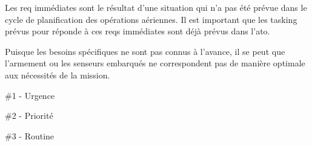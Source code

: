 Les \gls{req} immédiates sont le résultat d'une situation qui n'a pas été prévue dans le cycle de planification des opérations aériennes. Il est important que les tasking prévus pour réponde à ces \glspl{req} immédiates sont déjà prévus dans l'\gls{ato}.

Puisque les besoins spécifiques ne sont pas connus à l'avance, il se peut que l'armement ou les senseurs embarqués ne correspondent pas de manière optimale aux nécessités de la mission.

\begin{e1}
	\begin{e2}
		\item \#1 - Urgence
		\item \#2 - Priorité
		\item \#3 - Routine
	\end{e2}
\end{e1}



